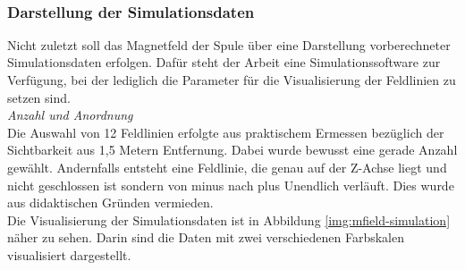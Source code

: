 \vspace{4px}
\begin{center}
	\\
\end{center}
\vspace{6px}

\subsubsection{Darstellung der Simulationsdaten}
\label{sec-4-4-3}
Nicht zuletzt soll das Magnetfeld der Spule über eine Darstellung vorberechneter Simulationsdaten erfolgen. Dafür steht der Arbeit eine Simulationssoftware zur Verfügung, bei der lediglich die Parameter für die Visualisierung der Feldlinien zu setzen sind.\\

\textit{Anzahl und Anordnung}\\
Die Auswahl von 12 Feldlinien erfolgte aus praktischem Ermessen bezüglich der Sichtbarkeit aus 1,5 Metern Entfernung. Dabei wurde bewusst eine gerade Anzahl gewählt. Andernfalls entsteht eine Feldlinie, die genau auf der Z-Achse liegt und nicht geschlossen ist sondern von minus nach plus Unendlich verläuft. Dies wurde aus didaktischen Gründen vermieden.\\
\noindent\hspace*{5mm}
Die Visualisierung der Simulationsdaten ist in Abbildung \ref{img:mfield-simulation} näher zu sehen. Darin sind die Daten mit zwei verschiedenen Farbskalen visualisiert dargestellt.

